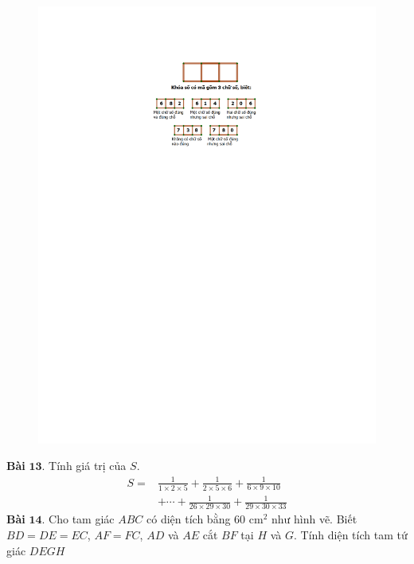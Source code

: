 \begin{multicols}{2}
\begin{figure}[H]
		\includegraphics[width= 1\linewidth]{bai12}
		\vspace*{-15pt}
	\end{figure}
	\textbf{\color{toancuabi}Bài} $\pmb{13.}$ Tính giá trị của $S$.
	\begin{align*}
		S =& \frac{1}{1\times 2 \times 5} + \frac{1}{2\times 5 \times 6} + \frac{1}{6\times9\times 10} \\
		&+ \cdots + \frac{1}{26 \times 29 \times 30} + \frac{1}{29\times 30 \times 33}
	\end{align*}
	\textbf{\color{toancuabi}Bài} $\pmb{14.}$ Cho tam giác $ABC$ có diện tích bằng $60$ cm$^2$ như hình vẽ. Biết $BD=DE=EC$, $AF=FC$, $AD$ và $AE$ cắt $BF$ tại $H$ và $G$. Tính diện tích tam tứ giác $DEGH$
	\begin{figure}[H]
		\vspace*{-5pt}
		\centering
		\captionsetup{labelformat= empty, justification=centering}

\end{figure}
\end{multicols}
